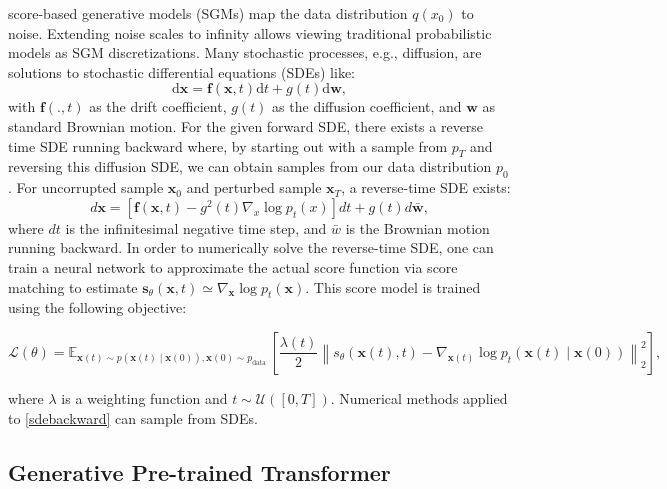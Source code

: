 \documentclass[preprint,12pt,authoryear]{elsarticle}
\begin{document}
score-based generative models (SGMs) \cite{78_score_based} map the data distribution $q(x_0)$ to noise. Extending noise scales to infinity allows viewing traditional probabilistic models as SGM discretizations. Many stochastic processes, e.g., diffusion, are solutions to stochastic differential equations (SDEs) like:
\begin{equation}
	\label{sde-base}
	\mathrm{d} \mathbf{x}=\mathbf{f}(\mathbf{x}, t) \mathrm{d} t+g(t) \mathrm{d} \mathbf{w} ,
\end{equation}
with $\mathbf{f}(., t)$ as the drift coefficient, $g(t)$ as the diffusion coefficient, and $\mathbf{w}$ as standard Brownian motion. For the given forward SDE, there exists a reverse time SDE running backward where, by starting out with a sample from $p_T$ and reversing this diffusion SDE, we can obtain samples from our data distribution $p_0$. For uncorrupted sample $\mathbf{x}_0$ and perturbed sample $\mathbf{x}_T$, a reverse-time SDE exists:
\begin{equation}
	\label{sdebackward}
	d \mathbf{x}=\left[\mathbf{f}(\mathbf{x}, t)-g^2(t) {\nabla_x \log p_t(x)}\right] d t+g(t) d \bar{\mathbf{w}} ,
\end{equation}
where $d t$ is the infinitesimal negative time step, and $\bar{w}$ is the Brownian motion running backward. In order to numerically solve the reverse-time SDE, one can train a neural network to approximate the actual score function via score matching \cite{77_diffusion,78_score_based} to estimate $\boldsymbol{s}_\theta(\boldsymbol{x}, t) \simeq \nabla_{\boldsymbol{x}} \log p_t(\boldsymbol{x})$.
This score model is trained using the following objective:

\begin{footnotesize}
\begin{equation}
	\mathcal{L}(\theta)=\mathbb{E}_{\mathbf{x}(t) \sim p(\mathbf{x}(t) \mid \mathbf{x}(0)), \mathbf{x}(0) \sim p_{\text {data }}}\left[\frac{\lambda(t)}{2}\left\|s_\theta(\mathbf{x}(t), t)-\nabla_{\mathbf{x}(t)} \log p_t(\mathbf{x}(t) \mid \mathbf{x}(0))\right\|_2^2\right] ,
\end{equation}
\end{footnotesize}where $\lambda$ is a weighting function and $t \sim \mathcal{U}([0, T])$. Numerical methods applied to \ref{sdebackward} can sample from SDEs.

\subsection{Generative Pre-trained Transformer}
\end{document}
